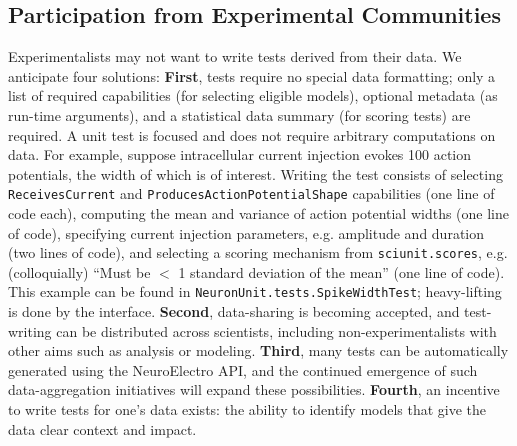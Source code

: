 \documentclass[11pt,letterpaper]{article}
\let\verbx\lstinline
\begin{document}
\subsection{Participation from Experimental Communities}
Experimentalists may not want to write tests derived from their data.  We anticipate four solutions: \textbf{First}, tests require no special data formatting; only a list of required  capabilities (for selecting eligible models), optional metadata (as run-time arguments), and a statistical data summary (for scoring tests) are required.  A unit test is focused and does not require arbitrary computations on data.  For example, suppose intracellular current injection evokes 100 action potentials, the width of which is of interest.  Writing the test consists of selecting \verbx{ReceivesCurrent} and \verbx{ProducesActionPotentialShape} capabilities (one line of code each), computing the mean and variance of action potential widths (one line of code), specifying current injection parameters, e.g. amplitude and duration (two lines of code), and selecting a scoring mechanism from \verbx{sciunit.scores}, e.g. (colloquially) ``Must be $<$ 1 standard deviation of the mean'' (one line of code).  This example can be found in \verbx{NeuronUnit.tests.SpikeWidthTest}; heavy-lifting is done by the interface.
\textbf{Second}, data-sharing is becoming accepted, and test-writing can be distributed across scientists, including non-experimentalists with other aims such as analysis or modeling. 
\textbf{Third}, many tests can be automatically generated using the NeuroElectro API, and the continued emergence of such data-aggregation initiatives will expand these possibilities. 
\textbf{Fourth}, an incentive to write tests for one's data exists: the ability to identify models that give the data clear context and impact. 
\end{document}
